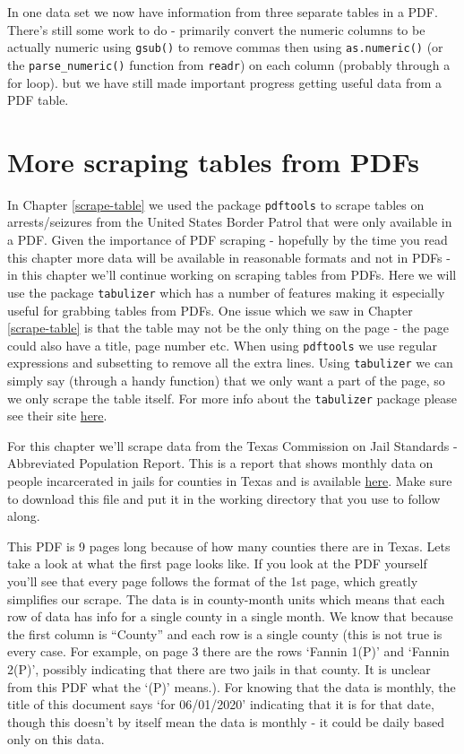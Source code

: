 \documentclass[
  12pt,
]{book}
\begin{document}
In one data set we now have information from three separate tables in a PDF. There's still some work to do - primarily convert the numeric columns to be actually numeric using \texttt{gsub()} to remove commas then using \texttt{as.numeric()} (or the \texttt{parse\_numeric()} function from \texttt{readr}) on each column (probably through a for loop). but we have still made important progress getting useful data from a PDF table.

\hypertarget{scrape-table2}{%
\chapter{More scraping tables from PDFs}\label{scrape-table2}}

In Chapter \ref{scrape-table} we used the package \texttt{pdftools} to scrape tables on arrests/seizures from the United States Border Patrol that were only available in a PDF. Given the importance of PDF scraping - hopefully by the time you read this chapter more data will be available in reasonable formats and not in PDFs - in this chapter we'll continue working on scraping tables from PDFs. Here we will use the package \texttt{tabulizer} which has a number of features making it especially useful for grabbing tables from PDFs. One issue which we saw in Chapter \ref{scrape-table} is that the table may not be the only thing on the page - the page could also have a title, page number etc. When using \texttt{pdftools} we use regular expressions and subsetting to remove all the extra lines. Using \texttt{tabulizer} we can simply say (through a handy function) that we only want a part of the page, so we only scrape the table itself. For more info about the \texttt{tabulizer} package please see their site \href{https://docs.ropensci.org/tabulizer/}{here}.

For this chapter we'll scrape data from the Texas Commission on Jail Standards - Abbreviated Population Report. This is a report that shows monthly data on people incarcerated in jails for counties in Texas and is available \href{https://github.com/jacobkap/crimebythenumbers/blob/master/data/AbbreRptCurrent.pdf}{here}. Make sure to download this file and put it in the working directory that you use to follow along.

This PDF is 9 pages long because of how many counties there are in Texas. Lets take a look at what the first page looks like. If you look at the PDF yourself you'll see that every page follows the format of the 1st page, which greatly simplifies our scrape. The data is in county-month units which means that each row of data has info for a single county in a single month. We know that because the first column is ``County'' and each row is a single county (this is not true is every case. For example, on page 3 there are the rows `Fannin 1(P)' and `Fannin 2(P)', possibly indicating that there are two jails in that county. It is unclear from this PDF what the `(P)' means.). For knowing that the data is monthly, the title of this document says `for 06/01/2020' indicating that it is for that date, though this doesn't by itself mean the data is monthly - it could be daily based only on this data.
\end{document}
